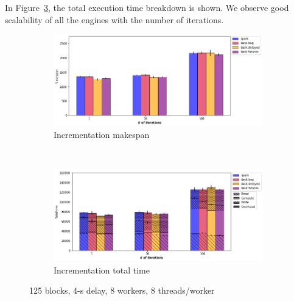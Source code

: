 \documentclass[conference]{IEEEtran}
\begin{document}
In Figure~\ref{fig:inc_tt_itr}, the total execution time breakdown is
shown. We observe good scalability of all the engines with the number of
iterations.



\begin{figure}[!t]
    \centering
    \begin{subfigure}[b]{\columnwidth}
        \includegraphics[clip,width=\columnwidth]{images/inc_itr.png}%
        \caption{Incrementation makespan}\label{fig:inc_ms_itr}
    \end{subfigure}
    \\
    \begin{subfigure}[b]{\columnwidth}
        \includegraphics[clip,width=\columnwidth]{images/inc_idle_itr.png}%
        \caption{Incrementation total time}\label{fig:inc_tt_itr}
    \end{subfigure}
    \caption{125 blocks, 4-s delay, 8 workers, 8 threads/worker}
\end{figure}
\end{document}
